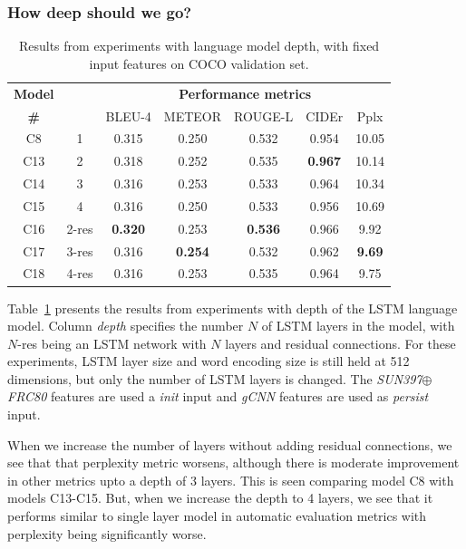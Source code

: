 \subsubsection{How deep should we go?}
\label{subsec:exptdepth}
\begin{table}[htp]
  \centering
  \newcommand{\bs}{\small}
  \begin{adjustbox}{center}
  \begin{tabular}{|c|c|c|c|c|c|c|}
    \hline
    \bf Model & \bf \multirow{2}{*}{Depth} & \multicolumn{5}{c|}{\bf Performance metrics}\\
    \cline{3-7}
    \bf \# &\bf &\bs BLEU-4 &\bs METEOR &\bs ROUGE-L &\bs CIDEr&\bs Pplx \\\hline
    C8  & 1   & 0.315 & 0.250 & 0.532 & 0.954 &10.05  \\\hline
    C13 & 2   & 0.318 & 0.252 & 0.535 &\bf0.967 & 10.14  \\
    C14 & 3   & 0.316 & 0.253 & 0.533 & 0.964   & 10.34  \\
    C15 & 4   & 0.316 & 0.250 & 0.533 & 0.956 & 10.69  \\\hline
    C16 &2-res&\bf0.320& 0.253 &\bf0.536&0.966  & 9.92   \\
    C17 &3-res& 0.316 &\bf0.254&0.532 & 0.962   &\bf9.69 \\
    C18 &4-res& 0.316 & 0.253 & 0.535 & 0.964   & 9.75 \\\hline
  \end{tabular}
  \end{adjustbox}
  \caption{Results from experiments with language model depth, with fixed input features on COCO validation set.}
  \label{tab:resCocDepthExpt}
\end{table}

Table~\ref{tab:resCocDepthExpt} presents the results from experiments with depth
of the LSTM language model.
Column \emph{depth} specifies the number $N$ of LSTM layers in the model,
with $N$-res being an LSTM network with $N$ layers and residual connections.
For these experiments, LSTM layer size and word encoding size is still held at
512 dimensions, but only the number of LSTM layers is changed.
The \emph{SUN397$\oplus$FRC80} features are used a \emph{init} input and
\emph{gCNN} features are used as \emph{persist} input.

When we increase the number of layers without adding residual connections, we
see that that perplexity metric worsens, although there is moderate improvement
in other metrics upto a depth of 3 layers.
This is seen comparing model C8 with models C13-C15.
But, when we increase the depth to 4 layers, we see that it performs similar to
single layer model in automatic evaluation metrics with perplexity being
significantly worse.

